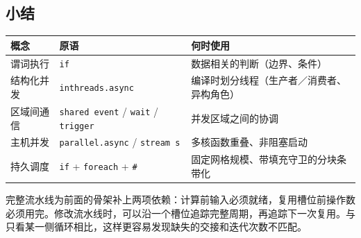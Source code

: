 \subsection*{小结}

\begin{table}[htbp]\centering\small
\begin{tabularx}{\linewidth}{@{}lXX@{}}
\toprule
\textbf{概念} & \textbf{原语} & \textbf{何时使用} \\
\midrule
谓词执行 & \texttt{if} & 数据相关的判断（边界、条件） \\
结构化并发 & \texttt{inthreads.async} & 编译时划分线程（生产者／消费者、异构角色） \\
区域间通信 & \texttt{shared event} / \texttt{wait} / \texttt{trigger} & 并发区域之间的协调 \\
主机并发 & \texttt{parallel.async} / \texttt{stream s} & 多核函数重叠、非阻塞启动 \\
持久调度 & \texttt{if} + \texttt{foreach} + \texttt{\#} & 固定网格规模、带填充守卫的分块条带化 \\
\bottomrule
\end{tabularx}
\end{table}

完整流水线为前面的骨架补上两项依赖：计算前输入必须就绪，复用槽位前操作数必须用完。修改流水线时，可以沿一个槽位追踪完整周期，再追踪下一次复用。与只看某一侧循环相比，这样更容易发现缺失的交接和迭代次数不匹配。
